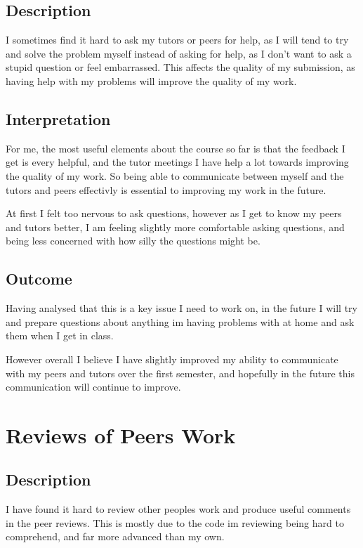 \documentclass{scrartcl}
\begin{document}
\subsection{Description} 

I sometimes find it hard to ask my tutors or peers for help, as I will tend to try and solve the problem myself instead of asking for help, as I don't want to ask a stupid question or feel embarrassed. This affects the quality of my submission, as having help with my problems will improve the quality of my work.

\subsection{Interpretation} 

For me, the most useful elements about the course so far is that the feedback I get is every helpful, and the tutor meetings I have help a lot towards improving the quality of my work. So being able to communicate between myself and the tutors and peers effectivly is essential to improving my work in the future.

At first I felt too nervous to ask questions, however as I get to know my peers and tutors better, I am feeling slightly more comfortable asking questions, and being less concerned with how silly the questions might be.

\subsection{Outcome} 

Having analysed that this is a key issue I need to work on, in the future I will try and prepare questions about anything im having problems with at home and ask them when I get in class.

However overall I believe I have slightly improved my ability to communicate with my peers and tutors over the first semester, and hopefully in the future this communication will continue to improve. 

\section{Reviews of Peers Work}

\subsection{Description} 

I have found it hard to review other peoples work and produce useful comments in the peer reviews. This is mostly due to the code im reviewing being hard to comprehend, and far more advanced than my own.
\end{document}
